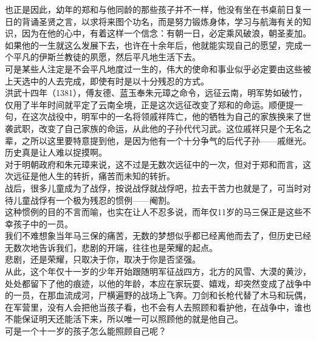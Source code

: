 \begin{multicols}{\theparacolNo}
也正是因此，幼年的郑和与他同龄的那些孩子并不一样，他没有坐在书桌前日复一日的背诵圣贤之言，以求将来图个功名，而是努力锻炼身体，学习与航海有关的知识，因为在他的心中，有着这样一个信念：有朝一日，必定乘风破浪，朝圣麦加。\\

如果他的一生就这么发展下去，也许在十余年后，他就能实现自己的愿望，完成一个平凡的伊斯兰教徒的夙愿，然后平凡地生活下去。\\

可是某些人注定是不会平凡地度过一生的，伟大的使命和事业似乎必定要由这些被上天选中的人去完成，即使有时是以十分残忍的方式。\\

洪武十四年（1381），傅友德、蓝玉奉朱元璋之命令，远征云南，明军势如破竹，仅用了半年时间就平定了云南全境，正是这次远征改变了郑和的命运。顺便提一句，在这次战役中，明军中的一名将领戚祥阵亡，他的牺牲为自己的家族换来了世袭武职，改变了自己家族的命运，从此他的子孙代代习武。这位戚祥只是个无名之辈，之所以这里要特意提到他，是因为他有一个十分争气的后代子孙——戚继光。\\

历史真是让人难以捉摸啊。\\

对于明朝政府和朱元璋来说，这不过是无数次远征中的一次，但对于郑和而言，这次远征是他人生的转折，痛苦而未知的转折。\\

战后，很多儿童成为了战俘，按说战俘就战俘吧，拉去干苦力也就是了，可当时对待儿童战俘有一个极为残忍的惯例——阉割。\\

这种惯例的目的不言而喻，也实在让人不忍多说，而年仅11岁的马三保正是这些不幸孩子中的一员。\\

我们不难想象当年马三保的痛苦，无数的梦想似乎都已经离他而去了，但历史已经无数次地告诉我们，悲剧的开端，往往也是荣耀的起点。\\

悲剧，还是荣耀，只取决于你，取决于你是否坚强。\\

从此，这个年仅十一岁的少年开始跟随明军征战四方，北方的风雪、大漠的黄沙，处处都留下了他的痕迹，以他的年龄，本应在家玩耍、嬉戏，却突然变成了战争中的一员，在那血流成河，尸横遍野的战场上飞奔。刀剑和长枪代替了木马和玩偶，在军营里，没有人会把他当孩子看，也不会有人去照顾和看护他，在战争中，谁也不能保证明天还能活下来，所以唯一可以照顾他的就是他自己。\\

可是一个十一岁的孩子怎么能照顾自己呢？\\


\end{multicols}
